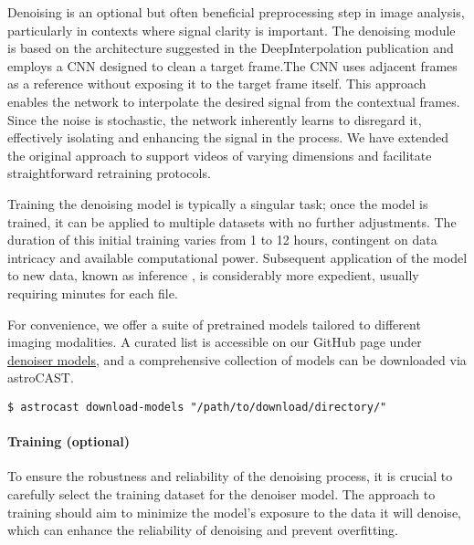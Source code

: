 Denoising is an optional but often beneficial preprocessing step in image analysis, particularly in contexts where
signal clarity is important. The denoising module is based on the architecture suggested in the DeepInterpolation
publication\citep{lecoq_removing_2021} and employs a \ac{CNN} designed
to clean a target frame.The \ac{CNN} uses adjacent frames as a reference without exposing it to the target frame
itself. This approach enables the network to interpolate the desired signal from the contextual frames. Since the
noise is stochastic, the network inherently learns to disregard it, effectively isolating and enhancing the signal in
the process. We have extended the original approach to support videos of varying dimensions and facilitate
straightforward retraining protocols.

Training the denoising model is typically a singular task; once the model is trained, it can be applied to multiple
datasets with no further adjustments. The duration of this initial training varies from 1 to 12 hours, contingent on
data intricacy and available computational power. Subsequent application of the model to new data, known as inference
, is considerably more expedient, usually requiring minutes for each file.

For convenience, we offer a suite of pretrained models tailored to different imaging modalities. A curated list is
accessible on our GitHub page under \href{https://github.com/janreising/astroCAST/tree/main/denoiser_models}{denoiser models}, and a comprehensive collection of models can be downloaded via astroCAST.

\begin{lstlisting}[style=bashStyle]
    $ astrocast download-models "/path/to/download/directory/"
\end{lstlisting}


\paragraph{Training (optional)}

To ensure the robustness and reliability of the denoising process, it is crucial to carefully select the training
dataset for the denoiser model. The approach to training should aim to minimize the model's exposure to the data it
will denoise, which can enhance the reliability of denoising and prevent overfitting.

